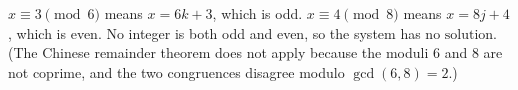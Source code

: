 $x\equiv3\pmod6$ means $x=6k+3$, which is odd. $x\equiv4\pmod8$ means $x=8j+4$, which is even. No integer is both odd and even, so the system has $\boxed{\text{no solution}}$. (The Chinese remainder theorem does not apply because the moduli $6$ and $8$ are not coprime, and the two congruences disagree modulo $\gcd(6,8)=2$.)
